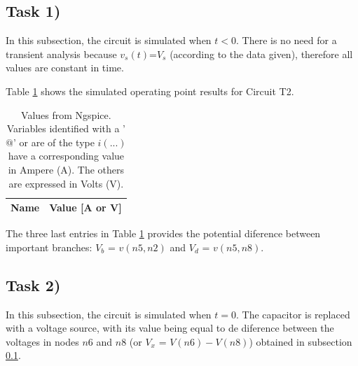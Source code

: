 \subsection{Task 1)}
\label{subsec:task1_s}


In this subsection, the circuit is simulated when $t<0$. There is no need for a
transient analysis because $v_s(t)$=$V_s$ (according to the data given), therefore
all values are constant in time. 

Table \ref{tab:op1} shows the simulated operating point results for Circuit T2.

\begin{table}[ht]
	\centering
	\begin{tabular}{|l|r|}
		\hline    
		{\bf Name} & {\bf Value [A or V]} \\ \hline
    		
	\end{tabular}
	
	\caption{Values from Ngspice. Variables identified with a '$@$' or are of the type
	$i(...)$ have a corresponding value in Ampere (A). The others are expressed in Volts (V).}
    
\label{tab:op1}
\end{table}

The three last entries in Table \ref{tab:op1} provides the potential diference between important
branches: $V_b$ = $v(n5,n2)$ and $V_d$ = $v(n5,n8)$.


\subsection{Task 2)}
\label{subsec:task2_s}


In this subsection, the circuit is simulated when $t=0$. The capacitor is replaced with a voltage source, 
with its value being equal to de diference between the voltages in nodes $n6$ and $n8$ (or $V_x$ = $V(n6)-
V(n8)$) obtained in subsection \ref{subsec:task1_s}.

